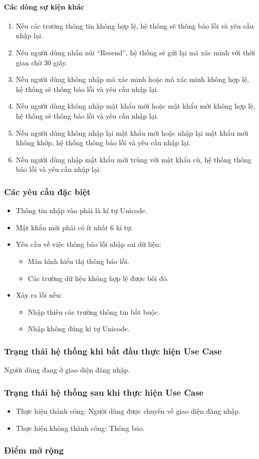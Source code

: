 \paragraph{\textbf{Các dòng sự kiện khác}}
\begin{enumerate}
  \item Nếu các trường thông tin không hợp lệ, hệ thống sẽ thông báo lỗi và yêu cầu nhập lại.
  \item Nếu người dùng nhấn núi ``Resend'', hệ thống sẽ gửi lại mã xác minh với thời gian chờ 30 giây.
  \item Nếu người dùng không nhập mã xác minh hoặc mã xác minh không hợp lệ, hệ thống sẽ thông báo lỗi và yêu cầu nhập lại.
  \item Nếu người dùng không nhập mật khẩu mới hoặc mật khẩu mới không hợp lệ, hệ thống sẽ thông báo lỗi và yêu cầu nhập lại.
  \item Nếu người dùng không nhập lại mật khẩu mới hoặc nhập lại mật khẩu mới không khớp, hệ thống thông báo lỗi và yêu cầu nhập lại.
  \item Nếu người dùng nhập mật khẩu mới trùng với mật khẩu cũ, hệ thống thông báo lỗi và yêu cầu nhập lại.
\end{enumerate}

\subsubsection{Các yêu cầu đặc biệt}
\begin{itemize}
  \item Thông tin nhập vào phải là kí tự Unicode.
  \item Mật khẩu mới phải có ít nhất 6 kí tự.
  \item Yêu cầu về việc thông báo lỗi nhập sai dữ liệu:
    \begin{itemize}
      \item Màn hình hiển thị thông báo lỗi.
      \item Các trường dữ liệu không hợp lệ được bôi đỏ.
    \end{itemize}
  \item Xảy ra lỗi nếu:
    \begin{itemize}
      \item Nhập thiếu các trường thông tin bắt buộc.
      \item Nhập không đúng kí tự Unicode.
    \end{itemize}
\end{itemize}

\subsubsection{Trạng thái hệ thống khi bắt đầu thực hiện Use Case}
Người dùng đang ở giao diện đăng nhập.

\subsubsection{Trạng thái hệ thống sau khi thực hiện Use Case}
\begin{itemize}
  \item Thực hiện thành công: Người dùng được chuyển về giao diện đăng nhập.
  \item Thực hiện không thành công: Thông báo.
\end{itemize}

\subsubsection{Điểm mở rộng}
